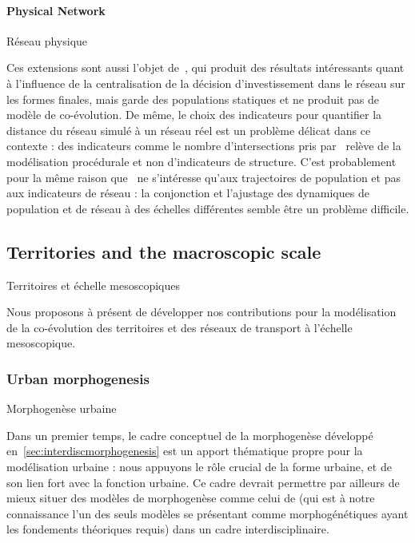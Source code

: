 \paragraph{Physical Network}{Réseau physique}



Ces extensions sont aussi l'objet de~\cite{mimeur:tel-01451164}, qui produit des résultats intéressants quant à l'influence de la centralisation de la décision d'investissement dans le réseau sur les formes finales, mais garde des populations statiques et ne produit pas de modèle de co-évolution. De même, le choix des indicateurs pour quantifier la distance du réseau simulé à un réseau réel est un problème délicat dans ce contexte : des indicateurs comme le nombre d'intersections pris par~\cite{mimeur:tel-01451164} relève de la modélisation procédurale et non d'indicateurs de structure. C'est probablement pour la même raison que~\cite{schmitt2014modelisation} ne s'intéresse qu'aux trajectoires de population et pas aux indicateurs de réseau : la conjonction et l'ajustage des dynamiques de population et de réseau à des échelles différentes semble être un problème difficile.





\subsection{Territories and the macroscopic scale}{Territoires et échelle mesoscopiques}

Nous proposons à présent de développer nos contributions pour la modélisation de la co-évolution des territoires et des réseaux de transport à l'échelle mesoscopique. 

\subsubsection{Urban morphogenesis}{Morphogenèse urbaine}


Dans un premier temps, le cadre conceptuel de la morphogenèse développé en~\ref{sec:interdiscmorphogenesis} est un apport thématique propre pour la modélisation urbaine : nous appuyons le rôle crucial de la forme urbaine, et de son lien fort avec la fonction urbaine. Ce cadre devrait permettre par ailleurs de mieux situer des modèles de morphogenèse comme celui de \cite{bonin2014modelisation} (qui est à notre connaissance l'un des seuls modèles se présentant comme morphogénétiques ayant les fondements théoriques requis) dans un cadre interdisciplinaire.

